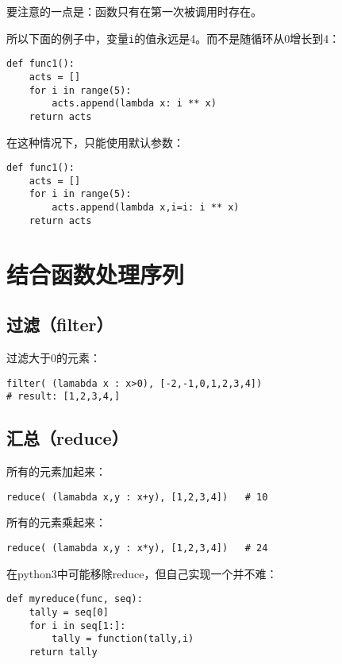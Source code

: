 		要注意的一点是：函数只有在第一次被调用时存在。
		
		所以下面的例子中，变量\verb|i|的值永远是4。而不是随循环从0增长到4：

\begin{lstlisting}
def func1():
	acts = []
	for i in range(5):
		acts.append(lambda x: i ** x)
	return acts
\end{lstlisting}

		在这种情况下，只能使用默认参数：

\begin{lstlisting}
def func1():
	acts = []
	for i in range(5):
		acts.append(lambda x,i=i: i ** x)
	return acts
\end{lstlisting}

\section{结合函数处理序列}

\subsection{过滤（filter）}

过滤大于0的元素：

\begin{lstlisting}
filter( (lamabda x : x>0), [-2,-1,0,1,2,3,4])
# result: [1,2,3,4,]
\end{lstlisting}

\subsection{汇总（reduce）}

所有的元素加起来：
\begin{lstlisting}
reduce( (lamabda x,y : x+y), [1,2,3,4])   # 10
\end{lstlisting}

所有的元素乘起来：
\begin{lstlisting}
reduce( (lamabda x,y : x*y), [1,2,3,4])   # 24
\end{lstlisting}

在python3中可能移除reduce，但自己实现一个并不难：
\begin{lstlisting}
def myreduce(func, seq):
	tally = seq[0]
	for i in seq[1:]:
		tally = function(tally,i)
	return tally
\end{lstlisting}
